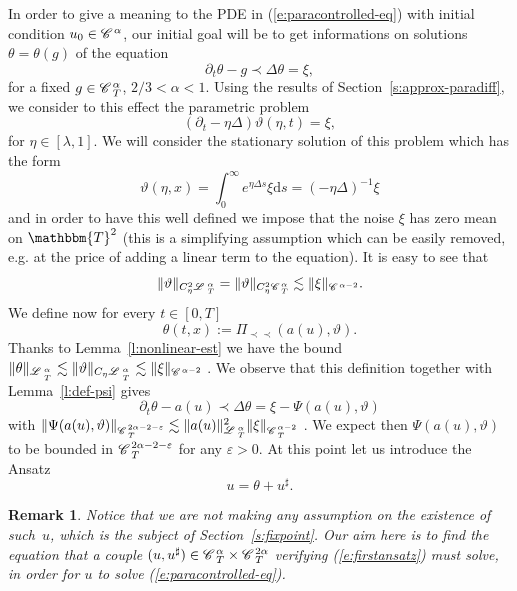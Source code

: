 \documentclass[11pt,reqno]{amsart}
\newcommand{\assign}{:=}
\newcommand{\mathd}{\mathrm{d}}
\newcommand{\precprec}{\prec\!\!\!\prec}
\newtheorem{remark}[theorem]{Remark}
\newcommand{\CC}{\mathscr{C} \hspace{.1em}}
\newcommand{\LL}{\mathscr{L} \hspace{.2em}}
\begin{document}
In order to give a meaning to the PDE in (\ref{e:paracontrolled-eq}) with
initial condition $u_0 \in \CC^{\alpha}$, our initial goal will be to get
informations on solutions $\theta = \theta (g)$ of the equation
\[ \partial_t \theta - g \prec \Delta \theta = \xi, \]
for a fixed $g \in \CC^{\alpha}_T$, $2 / 3 < \alpha < 1$. Using the results of
Section~\ref{s:approx-paradiff}, we consider to this effect the parametric
problem
\[ (\partial_t - \eta \Delta) \vartheta (\eta, t) = \xi, \]
for $\eta \in [\lambda, 1]$. We will consider the stationary solution of this
problem which has the form
\begin{equation}
  \vartheta (\eta, x) = \int_0^{\infty} e^{\eta \Delta s} \xi \mathd s = (-
  \eta \Delta)^{- 1} \xi \label{eq:def-theta}
\end{equation}
and in order to have this well defined we impose that the noise $\xi$ has zero
mean on $\mathbbm{T}^2$ (this is a simplifying assumption which can be easily
removed, e.g. at the price of adding a linear term to the equation). It is
easy to see that
\begin{equation}
  \| \vartheta \|_{C_{\eta}^2 \LL^{\alpha}_T} = \| \vartheta \|_{C_{\eta}^2
  \CC^{\alpha}_T} \lesssim \| \xi \|_{\CC^{\alpha - 2}} .
  \label{eq:vartheta-est} 
\end{equation}
We define now for every $t \in [0, T]$
\[ \theta (t, x) \assign \Pi_{\precprec} (a (u), \vartheta) . \]
Thanks to Lemma~\ref{l:nonlinear-est} we have the bound $\| \theta
\|_{\LL^{\alpha}_{_T}} \lesssim \| \vartheta \|_{C_{\eta} \LL^{\alpha}_{_T}}
\lesssim \| \xi \|_{\CC^{\alpha - 2}}$ . We observe that this definition
together with Lemma~\ref{l:def-psi} gives
\[ \partial_t \theta - a (u) \prec \Delta \theta = \xi - \Psi (a (u),
   \vartheta) \]
with $\| \Psi (a (u), \vartheta) \|_{\CC^{2 \alpha - 2 - \varepsilon}_T}
\lesssim \| a (u) \|^2_{\LL^{\alpha}_T} \| \xi \|_{\CC^{\alpha - 2}_T}$ . We
expect then $\Psi (a (u), \vartheta)$ to be bounded in $\CC^{2 \alpha - 2 -
\varepsilon}_T$ for any $\varepsilon > 0$. At this point let us introduce the
Ansatz
\begin{equation}
  u = \theta + u^{\sharp} . \label{e:firstansatz}
\end{equation}
\begin{remark}
  Notice that we are not making any assumption on the existence of such~$u$,
  which is the subject of Section~\ref{s:fixpoint}. Our aim here is to find
  the equation that a couple $(u, u^{\sharp}) \in \CC_T^{\alpha} \times
  \CC_T^{2 \alpha}$ verifying (\ref{e:firstansatz}) must solve, in order for
  $u$ to solve (\ref{e:paracontrolled-eq}).
\end{remark}
\end{document}
